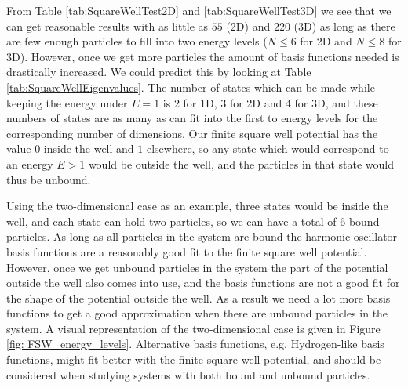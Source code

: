 \documentclass[../main.tex]{subfiles}
\begin{document}
From Table \ref{tab:SquareWellTest2D} and \ref{tab:SquareWellTest3D} we see that we can get reasonable results with as little as $55$ (2D) and $220$ (3D) as long as there are few enough particles to fill into two energy levels ($N\leq 6$ for 2D and $N\leq 8$ for 3D). However, once we get more particles the amount of basis functions needed is drastically increased. We could predict this by looking at Table \ref{tab:SquareWellEigenvalues}. The number of states which can be made while keeping the energy under $E=1$ is $2$ for 1D, $3$ for 2D and $4$ for 3D, and these numbers of states are as many as can fit into the first to energy levels for the corresponding number of dimensions. Our finite square well potential has the value $0$ inside the well and $1$ elsewhere, so any state which would correspond to an energy $E>1$ would be outside the well, and the particles in that state would thus be unbound. 

Using the two-dimensional case as an example, three states would be inside the well, and each state can hold two particles, so we can have a total of $6$ bound particles. As long as all particles in the system are bound the harmonic oscillator basis functions are a reasonably good fit to the finite square well potential. However, once we get unbound particles in the system the part of the potential outside the well also comes into use, and the basis functions are not a good fit for the shape of the potential outside the well. As a result we need a lot more basis functions to get a good approximation when there are unbound particles in the system. A visual representation of the two-dimensional case is given in Figure \ref{fig: FSW_energy_levels}. Alternative basis functions, e.g. Hydrogen-like basis functions, might fit better with the finite square well potential, and should be considered when studying systems with both bound and unbound particles. 
\end{document}
